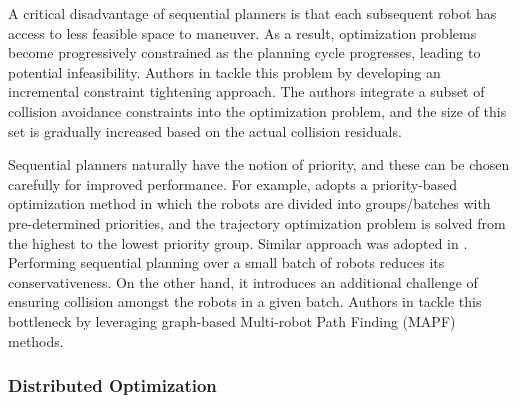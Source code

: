 A critical disadvantage of sequential planners is that each subsequent robot has access to less feasible space to maneuver. As a result, optimization problems become progressively constrained as the planning cycle progresses, leading to potential infeasibility. Authors in \citep{incremental_scp_how} tackle this problem by developing an incremental constraint tightening approach. The authors integrate a subset of collision avoidance constraints into the optimization problem, and the size of this set is gradually increased based on the actual collision residuals.

Sequential planners naturally have the notion of priority, and these can be chosen carefully for improved performance. For example, \citep{priority_seq} adopts a priority-based optimization method in which the robots are divided into groups/batches with pre-determined priorities, and the trajectory optimization problem is solved from the highest to the lowest priority group. Similar approach was adopted in \citep{park2020efficient}. Performing sequential planning over a small batch of robots reduces its conservativeness. On the other hand, it introduces an additional challenge of ensuring collision amongst the robots in a given batch. Authors in \citep{park2020efficient} tackle this bottleneck by leveraging graph-based Multi-robot Path Finding (MAPF) methods.





\subsubsection{Distributed Optimization} 

